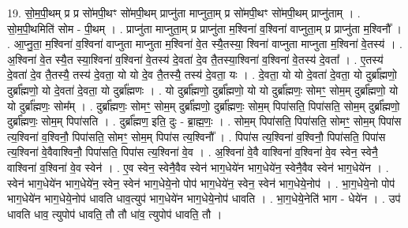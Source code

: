 \documentclass[17pt]{extarticle}
\begin{document}
19. सो॒म॒पी॒थम् प्र प्र सो॑मपी॒थꣳ सो॑मपी॒थम् प्राप्नु॑ता माप्नुता॒म् प्र सो॑मपी॒थꣳ सो॑मपी॒थम् प्राप्नु॑ताम् । . सो॒म॒पी॒थमिति॑ सोम - पी॒थम् । . प्राप्नु॑ता माप्नुता॒म् प्र प्राप्नु॑ता म॒श्विना॑ व॒श्विना॑ वाप्नुता॒म् प्र प्राप्नु॑ता म॒श्विनौ᳚ । . आ॒प्नु॒ता॒ म॒श्विना॑ व॒श्विना॑ वाप्नुता माप्नुता म॒श्विना॑ वे॒त स्यै॒तस्या॒ श्विना॑ वाप्नुता माप्नुता म॒श्विना॑ वे॒तस्य॑ । . अ॒श्विना॑ वे॒त स्यै॒त स्या॒श्विना॑ व॒श्विना॑ वे॒तस्य॑ दे॒वता॑ दे॒व तै॒तस्या॒श्विना॑ व॒श्विना॑ वे॒तस्य॑ दे॒वता᳚ । . ए॒तस्य॑ दे॒वता॑ दे॒व तै॒तस्यै॒ तस्य॑ दे॒वता॒ यो यो दे॒व तै॒तस्यै॒ तस्य॑ दे॒वता॒ यः । . दे॒वता॒ यो यो दे॒वता॑ दे॒वता॒ यो दुर्ब्रा᳚ह्मणो॒ दुर्ब्रा᳚ह्मणो॒ यो दे॒वता॑ दे॒वता॒ यो दुर्ब्रा᳚ह्मणः । . यो दुर्ब्रा᳚ह्मणो॒ दुर्ब्रा᳚ह्मणो॒ यो यो दुर्ब्रा᳚ह्मणः॒ सोमꣳ॒॒ सोम॒म् दुर्ब्रा᳚ह्मणो॒ यो यो दुर्ब्रा᳚ह्मणः॒ सोम᳚म् । . दुर्ब्रा᳚ह्मणः॒ सोमꣳ॒॒ सोम॒म् दुर्ब्रा᳚ह्मणो॒ दुर्ब्रा᳚ह्मणः॒ सोम॒म् पिपा॑सति॒ पिपा॑सति॒ सोम॒म् दुर्ब्रा᳚ह्मणो॒ दुर्ब्रा᳚ह्मणः॒ सोम॒म् पिपा॑सति । . दुर्ब्रा᳚ह्मण॒ इति॒ दुः - ब्रा॒ह्म॒णः॒ । . सोम॒म् पिपा॑सति॒ पिपा॑सति॒ सोमꣳ॒॒ सोम॒म् पिपा॑स त्य॒श्विना॑ व॒श्विनौ॒ पिपा॑सति॒ सोमꣳ॒॒ सोम॒म् पिपा॑स त्य॒श्विनौ᳚ । . पिपा॑स त्य॒श्विना॑ व॒श्विनौ॒ पिपा॑सति॒ पिपा॑स त्य॒श्विना॑ वे॒वैवाश्विनौ॒ पिपा॑सति॒ पिपा॑स त्य॒श्विना॑ वे॒व । . अ॒श्विना॑ वे॒वै वाश्विना॑ व॒श्विना॑ वे॒व स्वेन॒ स्वेनै॒ वाश्विना॑ व॒श्विना॑ वे॒व स्वेन॑ । . ए॒व स्वेन॒ स्वेनै॒वैव स्वेन॑ भाग॒धेये॑न भाग॒धेये॑न॒ स्वेनै॒वैव स्वेन॑ भाग॒धेये॑न । . स्वेन॑ भाग॒धेये॑न भाग॒धेये॑न॒ स्वेन॒ स्वेन॑ भाग॒धेये॒नो पोप॑ भाग॒धेये॑न॒ स्वेन॒ स्वेन॑ भाग॒धेये॒नोप॑ । . भा॒ग॒धेये॒नो पोप॑ भाग॒धेये॑न भाग॒धेये॒नोप॑ धावति धाव॒त्युप॑ भाग॒धेये॑न भाग॒धेये॒नोप॑ धावति । . भा॒ग॒धेये॒नेति॑ भाग - धेये॑न । . उप॑ धावति धाव॒ त्युपोप॑ धावति॒ तौ तौ धा॑व॒ त्युपोप॑ धावति॒ तौ । \newline
\end{document}
